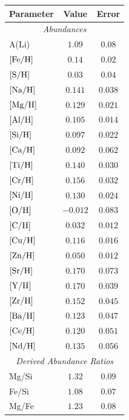 \documentclass[fleqn,usenatbib]{mnras}
\begin{document}
\begin{table}
    \centering
    \begin{tabular}{lcc}
        \hline
        \hline
        Parameter & Value & Error \\
        \hline
        \hline
        \multicolumn{3}{c}{\it Abundances}\\
        A(Li) & $1.09$ & $0.08$ \\
        $[\rm{Fe}/\rm{H}]$ & $0.14$ & $0.02$ \\
        $[\rm{S}/\rm{H}]$ & $0.03$ & $0.04$ \\
        $[\rm{Na}/\rm{H}]$ & $0.141$ & $0.038$ \\
        $[\rm{Mg}/\rm{H}]$ & $0.129$ & $0.021$ \\
        $[\rm{Al}/\rm{H}]$ & $0.105$ & $0.014$ \\
        $[\rm{Si}/\rm{H}]$ & $0.097$ & $0.022$ \\
        $[\rm{Ca}/\rm{H}]$ & $0.092$ & $0.062$ \\
        $[\rm{Ti}/\rm{H}]$ & $0.140$ & $0.030$ \\
        $[\rm{Cr}/\rm{H}]$ & $0.156$ & $0.032$ \\
        $[\rm{Ni}/\rm{H}]$ & $0.130$ & $0.024$ \\
        $[\rm{O}/\rm{H}]$ & $-0.012$ & $0.083$ \\
        $[\rm{C}/\rm{H}]$ & $0.032$ & $0.012$ \\
        $[\rm{Cu}/\rm{H}]$ & $   0.116 $ & $  0.016 $ \\
        $[\rm{Zn}/\rm{H}]$ & $   0.050 $ & $  0.012 $ \\
        $[\rm{Sr}/\rm{H}]$ & $   0.170 $ & $  0.073 $ \\
        $[\rm{Y}/\rm{H}]$ & $    0.170 $ & $  0.039 $ \\
        $[\rm{Zr}/\rm{H}]$ & $   0.152 $ & $  0.045 $ \\
        $[\rm{Ba}/\rm{H}]$ & $   0.123 $ & $  0.047 $ \\
        $[\rm{Ce}/\rm{H}]$ & $   0.120 $ & $  0.051 $ \\
        $[\rm{Nd}/\rm{H}]$ & $   0.135 $ & $  0.056 $ \\
        \hline
        \multicolumn{3}{c}{\it Derived Abundance Ratios}\\
        Mg/Si & $   1.32 $ & $ 0.09 $ \\
        Fe/Si & $   1.08 $ & $ 0.07 $ \\
        Mg/Fe & $   1.23 $ & $ 0.08 $ \\

\end{tabular}
\end{table}
\end{document}
